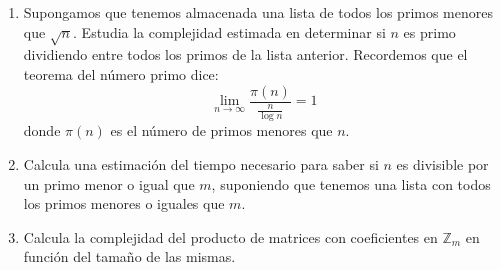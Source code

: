 	\begin{enumerate}
		\item Supongamos que tenemos almacenada una lista de todos los primos menores que $\sqrt{n}$. Estudia la
		complejidad estimada en determinar si $n$ es primo dividiendo entre todos los primos de la lista anterior.
		Recordemos que el teorema del número primo dice:
		$$\lim\limits_{n \rightarrow \infty} \frac{\pi (n)}{\frac{n}{\log n}} = 1$$
		donde $\pi (n)$ es el número de primos menores que $n$.
		\item Calcula una estimación del tiempo necesario para saber si $n$ es divisible por un primo menor o
		igual que $m$, suponiendo que tenemos una lista con todos los primos menores o iguales que $m$.
		\item Calcula la complejidad del producto de matrices con coeficientes en $\mathbb{Z}_m$ en función del
		tamaño de las mismas.
	\end{enumerate}
